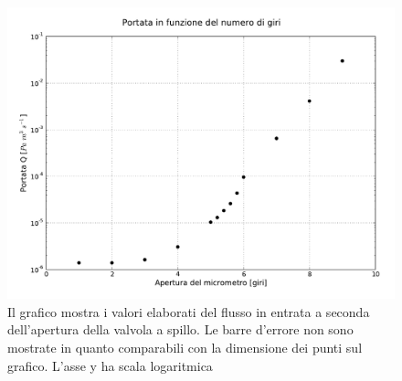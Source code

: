 \begin{figure}[h!]
    \includegraphics[width=16cm]{graph.pdf}
    \caption{Il grafico mostra i valori elaborati del flusso in entrata a seconda dell'apertura della valvola a spillo. Le barre d'errore non sono
    mostrate in quanto comparabili con la dimensione dei punti sul grafico. L'asse y ha scala logaritmica}
    \label{fig:graph}
\end{figure}
